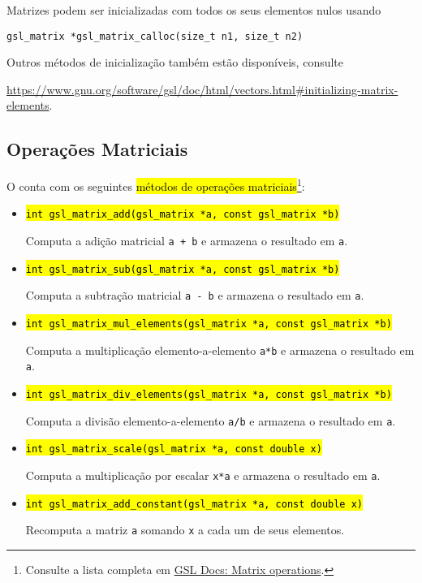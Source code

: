 \documentclass[12pt]{article}
\begin{document}
\begin{obs}
  Matrizes podem ser inicializadas com todos os seus elementos nulos usando
\begin{lstlisting}
gsl_matrix *gsl_matrix_calloc(size_t n1, size_t n2)
\end{lstlisting}
  Outros métodos de inicialização também estão disponíveis, consulte
  \begin{center}
    \url{https://www.gnu.org/software/gsl/doc/html/vectors.html#initializing-matrix-elements}.
  \end{center}
\end{obs}

\subsection{Operações Matriciais}

O {\gsl} conta com os seguintes \hl{métodos de operações matriciais}\footnote{Consulte a lista completa em \href{https://www.gnu.org/software/gsl/doc/html/vectors.html\#matrix-operations}{GSL Docs: Matrix operations}.}:
\begin{itemize}
\item \hl{{\lstinline!int gsl_matrix_add(gsl_matrix *a, const gsl_matrix *b)!}}

  Computa a adição matricial \lstinline!a + b! e armazena o resultado em \lstinline!a!.

\item \hl{{\lstinline!int gsl_matrix_sub(gsl_matrix *a, const gsl_matrix *b)!}}

  Computa a subtração matricial \lstinline!a - b! e armazena o resultado em \lstinline!a!.

\item \hl{{\lstinline!int gsl_matrix_mul_elements(gsl_matrix *a, const gsl_matrix *b)!}}

  Computa a multiplicação elemento-a-elemento \lstinline!a*b! e armazena o resultado em \lstinline!a!.

\item \hl{{\lstinline!int gsl_matrix_div_elements(gsl_matrix *a, const gsl_matrix *b)!}}

  Computa a divisão elemento-a-elemento \lstinline!a/b! e armazena o resultado em \lstinline!a!.

\item \hl{{\lstinline!int gsl_matrix_scale(gsl_matrix *a, const double x)!}}

  Computa a multiplicação por escalar \lstinline!x*a! e armazena o resultado em \lstinline!a!.

\item \hl{{\lstinline!int gsl_matrix_add_constant(gsl_matrix *a, const double x)!}}

  Recomputa a matriz \lstinline+a+ somando \lstinline+x+ a cada um de seus elementos.
\end{itemize}
\end{document}
